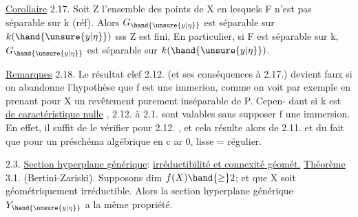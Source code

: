
\uline{Corollaire} 2.17.   Soit Z l'ensemble des points de X en lesquels F
n'est pas séparable sur k (réf). Alors  $G_{\hand{\unsure{y|\eta}}}$ est séparable sur $k(\hand{\unsure{y|\eta}})$ sss
Z est fini, En particulier, si F est séparable sur k, $G_{\hand{\unsure{y|\eta}}}$ est séparable
sur $k(\hand{\unsure{y|\eta}})$.

\uline{Remarques} 2.18.  Le résultat clef  2.12. (et ses conséquences  à 2.17.) devient faux si on abandonne
l'hypothèse que f est une immerion, comme  on voit par exemple en
prenant pour  X un revêtement purement inséparable de P.   Cepen-%
dant 
  si  k est \uline{de caractéristique nulle} ,  2.12. à
2.1. sont valables sans supposer f une immersion.  En effet, il suffit
de le vérifier pour 2.12. , et  cela résulte alors de 2.11. et du fait
que  pour un préschéma algébrique en c ar 0,  lisse = régulier.



2.3.   \uline{Section hyperplane générique}: \uline{irréductibilité et connexité géomét.}
\uline{Théorème} 3.1. (Bertini-Zariski).  Supposons dim $f(X) \hand{\geq} 2$; et que X
soit  géométriquement irréductible. Alors
la section hyperplane générique $Y_{\hand{\unsure{y|\eta}}}$ a la même propriété.



